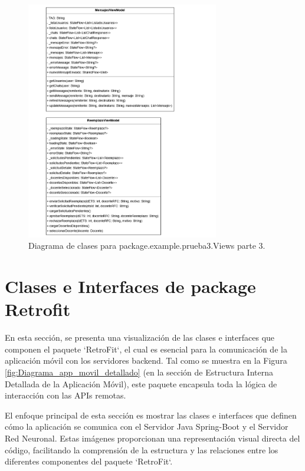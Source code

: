 \begin{figure}[htbp!]
	\begin{center}
		\includegraphics[width=0.75\textwidth]{DiagramasMoviles/DCM (9)}
		\caption{Diagrama de clases para package.example.prueba3.Views parte 3.}
		\label{fig:Views3}
	\end{center}
\end{figure}

\newpage

\section{Clases e Interfaces de package Retrofit}

En esta sección, se presenta una visualización de las clases e interfaces que componen el paquete `RetroFit`, el cual es esencial para la comunicación de la aplicación móvil con los servidores backend. Tal como se muestra en la Figura \ref{fig:Diagrama_app_movil_detallado} (en la sección de Estructura Interna Detallada de la Aplicación Móvil), este paquete encapsula toda la lógica de interacción con las APIs remotas.

El enfoque principal de esta sección es mostrar las clases e interfaces que definen cómo la aplicación se comunica con el Servidor Java Spring-Boot y el Servidor Red Neuronal. Estas imágenes proporcionan una representación visual directa del código, facilitando la comprensión de la estructura y las relaciones entre los diferentes componentes del paquete `RetroFit`.

